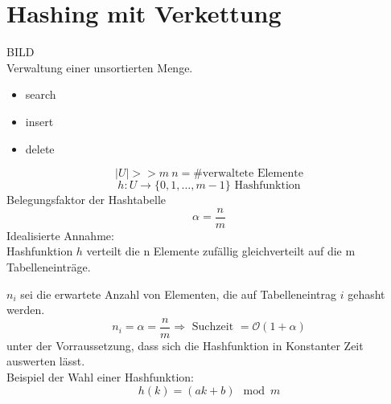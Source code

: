\documentclass[a4paper,twoside,10pt]{report}
\begin{document}
\section{Hashing mit Verkettung}
BILD\\
Verwaltung einer unsortierten Menge.
\begin{itemize}
\item search
\item insert
\item delete
\end{itemize}
\[|U|>>m~n=\#\mbox{verwaltete Elemente}\]
\[h:U\rightarrow\{0,1,\hdots,m-1\}\mbox{ Hashfunktion}\]
Belegungsfaktor der Hashtabelle
\[\alpha =\frac{n}{m}\]
Idealisierte Annahme:\\
Hashfunktion $h$ verteilt die n Elemente zufällig gleichverteilt auf die m Tabelleneinträge.

$n_i$ sei die erwartete Anzahl von Elementen, die auf Tabelleneintrag $i$ gehasht werden.
\[n_i=\alpha =\frac{n}{m}\Rightarrow \mbox{ Suchzeit }=\mathcal O(1+\alpha)\]
unter der Vorraussetzung, dass sich die Hashfunktion in Konstanter Zeit auswerten lässt.\\
Beispiel der Wahl einer Hashfunktion:
\[h(k)=(ak+b)\mod m\]
\end{document}
